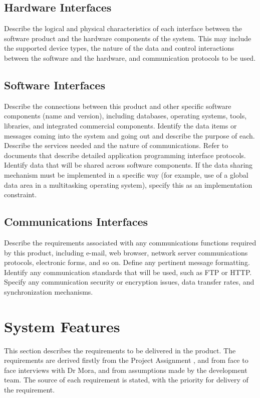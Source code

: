 \documentclass[a4paper,10pt]{article}
\begin{document}
\subsection{Hardware Interfaces}
Describe the logical and physical characteristics of each interface between the software product and the hardware components of the system. This may include the supported device types, the nature of the data and control interactions between the software and the hardware, and communication protocols to be used.
\subsection{Software Interfaces}
Describe the connections between this product and other specific software components (name and version), including databases, operating systems, tools, libraries, and integrated commercial components. Identify the data items or messages coming into the system and going out and describe the purpose of each. Describe the services needed and the nature of communications. Refer to documents that describe detailed application programming interface protocols. Identify data that will be shared across software components. If the data sharing mechanism must be implemented in a specific way (for example, use of a global data area in a multitasking operating system), specify this as an implementation constraint.
\subsection{Communications Interfaces}
Describe the requirements associated with any communications functions required by this product, including e-mail, web browser, network server communications protocols, electronic forms, and so on. Define any pertinent message formatting. Identify any communication standards that will be used, such as FTP or HTTP. Specify any communication security or encryption issues, data transfer rates, and synchronization mechanisms.


\section{System Features}

This section describes the requirements to be delivered in the product. The requirements are derived firstly from the Project Assignment  , and from face to face interviews with Dr Mora, and from assumptions made by the development team. The source of each requirement is stated, with the priority for delivery of the requirement. 
\end{document}
